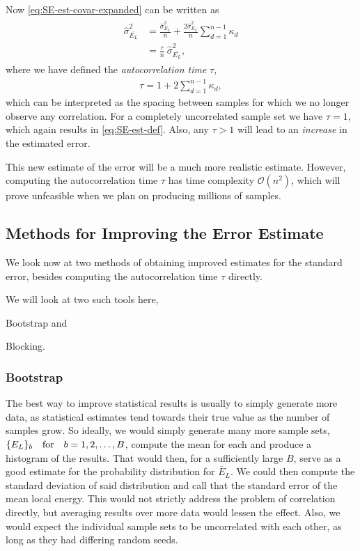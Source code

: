 \documentclass[a4paper, 11pt]{article}
\begin{document}
\begin{multicols}{2}
Now \eqref{eq:SE-est-covar-expanded} can be written as
\begin{align}
    \begin{split}
    \hat{\sigma}^2_{\bar{E_L}} &= \frac{\hat{\sigma}^2_{E_L}}{n} +
    \frac{2\hat{\sigma}^2_{E_L}}{n}\sum_{d=1}^{n-1}\kappa_d\\
    &= \frac{\tau}{n}\ \hat{\sigma}^2_{\bar{E_L}},
    \end{split}
\end{align}
where we have defined the \textit{autocorrelation time} $\tau$, 
\begin{align}
    \tau = 1 + 2\sum_{d=1}^{n-1}\kappa_d,\label{eq:autocorr-time-def}
\end{align}
which can be interpreted as the spacing between samples for which we no longer
observe any correlation. For a completely uncorrelated sample set we have $\tau
=1$, which again results in \eqref{eq:SE-est-def}. Also, any $\tau>1$ will lead
to an \textit{increase} in the estimated error.

This new estimate of the error will be a much more realistic estimate. However,
computing the autocorrelation time $\tau$ has time complexity $\mathcal{O}(n^2)$, which will prove
unfeasible when we plan on producing millions of samples.

\subsection{Methods for Improving the Error Estimate}

We look now at two methods of obtaining improved estimates for the standard
error, besides computing the autocorrelation time $\tau$ directly.

We will look at two such tools here, 
\begin{inparaenum}[1)]
    \item Bootstrap and
    \item Blocking.
\end{inparaenum}

\subsubsection{Bootstrap}
The best way to improve statistical results is usually to simply generate more
data, as statistical estimates tend towards their true value as the number of
samples grow. So ideally, we would simply generate many more sample sets,
$\{E_L\}_b \qfor b=1, 2, \dots, B$, compute the mean for each and produce a
histogram of the results. That would then, for a sufficiently large $B$, serve as
a good estimate for the probability distribution for $\bar E_L$. We could then
compute the standard deviation of said distribution and call that the standard
error of the mean local energy. This would not strictly address the problem of
correlation directly, but averaging results over more data would lessen the
effect. Also, we would expect the individual sample sets to be uncorrelated with
each other, as long as they had differing random seeds.


\end{multicols}
\end{document}
